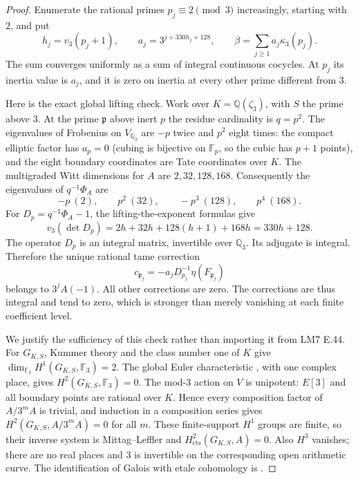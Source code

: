 \begin{proof}
Enumerate the rational primes $p_j\equiv2\pmod3$ increasingly, starting
with $2$, and put
\[
 h_j=v_3(p_j+1),\qquad
 a_j=3^{j+330h_j+128},\qquad
 \beta=\sum_{j\geq1}a_j\kappa_3(p_j).                              \tag{B.7.2}
\]
The sum converges uniformly as a sum of integral continuous cocycles.
At $p_j$ its inertia value is $a_j$, and it is zero on inertia at
every other prime different from $3$.

Here is the exact global lifting check. Work over
$K=\mathbb Q(\zeta_3)$, with $S$ the prime above $3$. At the prime
$\mathfrak p$ above inert $p$ the residue cardinality is $q=p^2$.
The eigenvalues of Frobenius on $V_{\mathbb Q_3}$ are $-p$ twice
and $p^2$ eight times: the compact elliptic factor has $a_p=0$
(cubing is bijective on $\mathbb F_p$, so the cubic has $p+1$
points), and the eight boundary coordinates are Tate coordinates over $K$.
The multigraded Witt dimensions for $A$ are
$2,32,128,168$. Consequently the eigenvalues of
$q^{-1}\Phi_A$ are
\[
 -p\ (2),\qquad p^2\ (32),\qquad -p^3\ (128),\qquad p^4\ (168).
\]
For $D_p=q^{-1}\Phi_A-1$, the lifting-the-exponent formulas give
\[
 v_3(\det D_p)=2h+32h+128(h+1)+168h=330h+128.                     \tag{B.7.3}
\]
The operator $D_p$ is an integral matrix, invertible over $\mathbb Q_3$.
Its adjugate is integral. Therefore the unique rational tame correction
\[
 c_{\mathfrak p_j}=-a_jD_{p_j}^{-1}\eta(F_{\mathfrak p_j})
\]
belongs to $3^jA(-1)$. All other corrections are zero. The
corrections are thus integral and tend to zero, which is stronger than
merely vanishing at each finite coefficient level.

We justify the sufficiency of this check rather than importing it
from LM7 E.44. For $G_{K,S}$, Kummer theory and the class number one
of $K$ give $\dim_{\mathbb F_3}H^1(G_{K,S},\mathbb F_3)=2$.
The global Euler characteristic
\citep[I, Theorem 5.1]{BMilne2006}, with one complex place, gives
$H^2(G_{K,S},\mathbb F_3)=0$. The mod-$3$ action on $V$ is
unipotent: $E[3]$ and all boundary points are rational over $K$.
Hence every composition factor of $A/3^mA$ is trivial, and induction
in a composition series gives $H^2(G_{K,S},A/3^mA)=0$ for all $m$.
These finite-support $H^1$ groups are finite, so their inverse system
is Mittag--Leffler and
$H^2_{\mathrm{cts}}(G_{K,S},A)=0$. Also $H^3$ vanishes; there are
no real places and $3$ is invertible on the corresponding open
arithmetic curve. The identification of Galois with etale cohomology
is \citet[II, Proposition 2.9]{BMilne2006}.


\end{proof}
